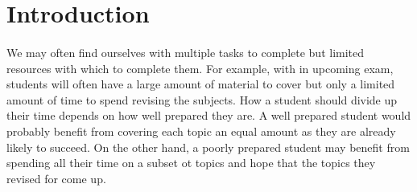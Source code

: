 \documentclass[12pt]{article}
\begin{document}

\begingroup\singlespacing
\newpage
\tableofcontents
\newpage
\endgroup

\section*{Introduction}

\paragraph{} We may often find ourselves with multiple tasks to complete but limited resources with which to complete them. For example, with in upcoming exam, students will often have a large amount of material to cover but only a limited amount of time to spend revising the subjects. How a student should divide up their time depends on how well prepared they are. A well prepared student would probably benefit from covering each topic an equal amount as they are already likely to succeed. On the other hand, a poorly prepared student may benefit from spending all their time on a subset ot topics and hope that the topics they revised for come up. %
\end{document}
